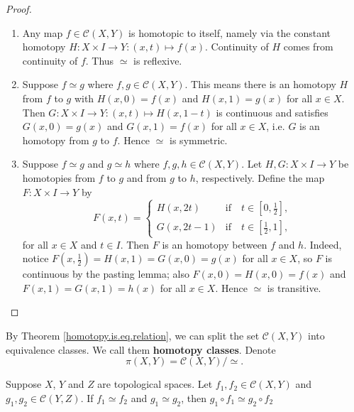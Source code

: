 \begin{proof}
\begin{enumerate}[label=(\roman*)] 
    \item Any map \(f\in \mathcal{C}(X,Y)\) is homotopic to itself, namely via the constant homotopy \(H\colon X\times I \to Y: (x,t)\mapsto f(x)\). Continuity of \(H\) comes from continuity of \(f\). Thus \(\simeq\) is reflexive.
    \item  Suppose \(f\simeq g\) where \(f,g\in \mathcal{C}(X,Y)\). This means  there is an homotopy \(H\) from \(f\) to \(g\) with \(H(x,0) =  f(x)\) and \(H(x,1) =  g(x)\) for all \(x\in X\). Then \(G\colon X\times I \to Y: (x,t)\mapsto H(x,1-t)\) is continuous  and satisfies \(G(x,0) = g(x)\) and \(G(x,1) = f(x)\) for all \(x\in X\), i.e. \(G\) is an homotopy from \(g\) to \(f\). Hence \(\simeq\) is symmetric.
    \item Suppose \(f\simeq g\) and \(g\simeq h\) where \(f,g,h\in \mathcal{C}(X,Y)\). Let \(H,G\colon X\times I\to Y\) be homotopies from \(f\) to \(g\) and from \(g\) to \(h\), respectively. Define the map \(F\colon X\times I \to  Y\) by \[
        F(x,t) = \begin{cases}
            H(x,2t)     & \text{if}\quad t\in [0,\frac{1}{2}],\\
            G(x,2t -1)  & \text{if}\quad t\in [\frac{1}{2},1],
        \end{cases}
    \] for all \(x\in X\) and \(t\in I\). Then \(F\) is an homotopy between \(f\) and \(h\). Indeed, notice \(F(x,\frac{1}{2})= H(x,1)=G(x,0)=g(x)\) for all \(x\in X\), so  \(F\) is continuous by the pasting lemma; also \(F(x,0) = H(x,0)= f(x)\) and \(F(x,1) =G(x,1)= h(x)\) for all \(x\in X\). Hence \(\simeq\) is transitive.
\end{enumerate}
\end{proof}


By Theorem \ref{homotopy.is.eq.relation}, we can split the set  \(\mathcal{C}(X,Y)\) into equivalence classes. We call them \textbf{homotopy classes}. Denote  \[\pi(X,Y) = \mathcal{C}(X,Y) / \simeq.\] 

\begin{theoremaa}
    Suppose \(X\), \(Y\) and \(Z\) are topological spaces. Let 
     \(f_1, f_2 \in \mathcal{C}(X,Y)\) and \(g_1, g_2 \in \mathcal{C}(Y, Z)\). If \(f_1 \simeq f_2\) and \(g_1 \simeq g_2\), then \(g_1 \circ f_1 \simeq g_2\circ f_2\)
\end{theoremaa}

